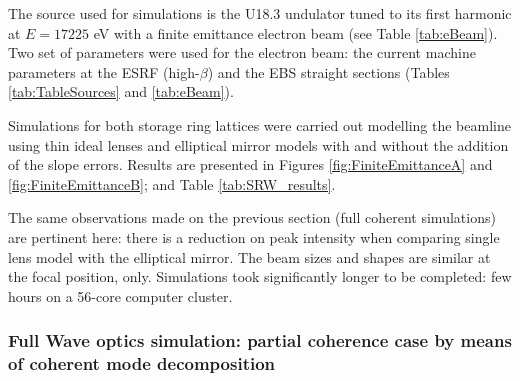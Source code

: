 \documentclass{iucr}              %
\begin{document}
The source used for simulations is the U18.3 undulator tuned to its first harmonic at $E=17225$ eV with a finite emittance electron beam (see Table \ref{tab:eBeam}). Two set of parameters were used for the electron beam: the current machine parameters at the ESRF (high-$\beta$) and the EBS straight sections (Tables \ref{tab:TableSources} and \ref{tab:eBeam}). 

Simulations for both storage ring lattices were carried out modelling the beamline using thin ideal lenses and elliptical mirror models with and without the addition of the slope errors. Results are presented in Figures \ref{fig:FiniteEmittanceA} and \ref{fig:FiniteEmittanceB}; and Table \ref{tab:SRW_results}.

The same observations made on the previous section (full coherent simulations) are pertinent here: there is a reduction on peak intensity when comparing single lens model with the elliptical mirror. The beam sizes and shapes are similar at the focal position, only. Simulations took significantly longer to be completed: few hours on a 56-core computer cluster.


% 


% 
% 
%  
\subsubsection{Full Wave optics simulation: partial coherence case by means of coherent mode decomposition}
% 
\end{document}
